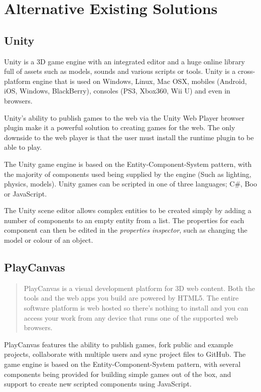 \section{Alternative Existing Solutions}
\subsection{Unity}
Unity is a 3D game engine with an integrated editor and a huge online library full of assets such as models, sounds and various scripts or tools. Unity is a cross-platform engine that is used on Windows, Linux, Mac OSX, mobiles (Android, iOS, Windows, BlackBerry), consoles (PS3, Xbox360, Wii U) and even in browsers.\cite{unity}

Unity's ability to publish games to the web via the Unity Web Player browser plugin make it a powerful solution to creating games for the web. The only downside to the web player is that the user must install the runtime plugin to be able to play.\cite{unityweb}

The Unity game engine is based on the Entity-Component-System pattern, with the majority of components used being supplied by the engine (Such as lighting, physics, models).\cite{unitycomponents} Unity games can be scripted in one of three languages; C\#, Boo or JavaScript.

The Unity scene editor allows complex entities to be created simply by adding a number of components to an empty entity from a list. The properties for each component can then be edited in the \emph{properties inspector}, such as changing the model or colour of an object. \cite{unitycreatingscenes}


\subsection{PlayCanvas}
\begin{quote}
PlayCanvas is a visual development platform for 3D web content. Both the tools and the web apps you build are powered by HTML5. The entire software platform is web hosted so there's nothing to install and you can access your work from any device that runs one of the supported web browsers.\cite{playcanvas}
\end{quote}

PlayCanvas features the ability to publish games, fork public and example projects, collaborate with multiple users and sync project files to GitHub. The game engine is based on the Entity-Component-System pattern, with several components being provided for building simple games out of the box, and support to create new scripted components using JavaScript.\cite{playcanvas}

